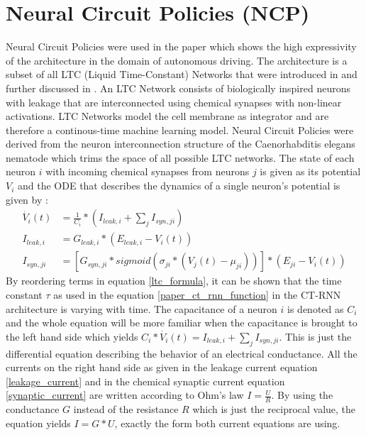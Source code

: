 \documentclass[draft,final]{vutinfth} %
\begin{document}
    \section{Neural Circuit Policies (NCP)} \label{ncp}
    Neural Circuit Policies were used in the paper \cite{NCP} which shows the high expressivity of the architecture in the domain of autonomous driving.
    The architecture is a subset of all LTC (Liquid Time-Constant) Networks that were introduced in \cite{LTCFormulas} and further discussed in \cite{LTCNetworks}.
    An LTC Network consists of biologically inspired neurons with leakage that are interconnected using chemical synapses with non-linear activations.
    LTC Networks model the cell membrane as integrator and are therefore a continous-time machine learning model.
    Neural Circuit Policies were derived from the neuron interconnection structure of the Caenorhabditis elegans nematode \cite[p. 3]{NCP} which trims the space of all possible LTC networks.
    The state of each neuron $i$ with incoming chemical synapses from neurons $j$ is given as its potential $V_i$ and the ODE that describes the dynamics of a single neuron's potential is given by \cite[p. 1-2]{LTCFormulas}:
    \begin{align}
    \label{ltc_formula}
    \dot{V_i}(t) &= \frac{1}{C_i} * (I_{leak,i} + \sum_j{I_{syn,ji}}) \\
    \label{leakage_current}
    I_{leak,i} &= G_{leak,i} * (E_{leak,i} - V_i(t)) \\
    \label{synaptic_current}
    I_{syn,ji} &= [G_{syn,ji} * sigmoid(\sigma_{ji}*(V_j(t)-\mu_{ji}))] * (E_{ji} - V_i(t))
    \end{align}
    By reordering terms in equation \ref{ltc_formula}, it can be shown that the time constant $\tau$ as used in the equation \ref{paper_ct_rnn_function} in the CT-RNN architecture is varying with time.
    The capacitance of a neuron $i$ is denoted as $C_i$ and the whole equation will be more familiar when the capacitance is brought to the left hand side which yields $C_i * \dot{V_i}(t) = I_{leak,i} + \sum_j{I_{syn,ji}}$.
    This is just the differential equation describing the behavior of an electrical conductance.
    All the currents on the right hand side as given in the leakage current equation \ref{leakage_current} and in the chemical synaptic current equation \ref{synaptic_current} are written according to Ohm's law $I = \frac{U}{R}$.
    By using the conductance $G$ instead of the resistance $R$ which is just the reciprocal value, the equation yields $I = G * U$, exactly the form both current equations are using.
\end{document}
